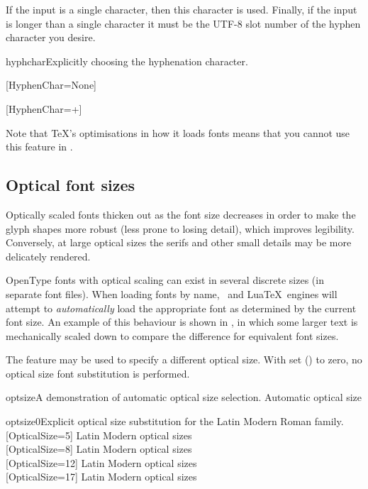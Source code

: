 \documentclass[a4paper]{l3doc}
\begin{document}
If the input is a single character, then this character is used.
Finally, if the input is longer than a single character
it must be the UTF-8 slot number of the hyphen character you desire.

\begin{Xexample}{hyphchar}{Explicitly choosing the hyphenation character.}
 \def\text{\fbox{\parbox{1.55cm}{%
   EXAMPLE HYPHENATION%
 }}\qquad\qquad\null\par\bigskip}

 [HyphenChar=None]
 \text
 [HyphenChar={+}]
 \text
\end{Xexample}

Note that \TeX's optimisations in how it loads fonts means that you cannot
use this feature in .

\subsection{Optical font sizes} \label{sec:opticalsize}

Optically scaled fonts thicken out as the font size decreases
in order to make the glyph shapes more robust (less prone to losing
detail), which improves legibility. Conversely, at large optical
sizes the serifs and other small details may be more delicately
rendered.

OpenType fonts with optical scaling can exist in
several discrete sizes (in separate font files).
When loading fonts by name, \XeTeX\ and Lua\TeX\ engines will attempt to
\emph{automatically} load the appropriate font as determined by the current font size.
An example of this behaviour is shown in , in which some larger text is
mechanically scaled down to compare the difference for equivalent font sizes.

The  feature may be used to specify a different optical size.
With  set ()
to zero, no optical size font substitution is performed.

\begin{Lexample}{optsize}{A demonstration of automatic optical size selection.}
   Automatic optical size                  \\
  \scalebox{0.4}{\Huge
   Automatic optical size}
\end{Lexample}

\begin{Lexample}{optsize0}{Explicit optical size substitution for the Latin Modern Roman family.}
  [OpticalSize=5]
   Latin Modern optical sizes                \\
  [OpticalSize=8]
   Latin Modern optical sizes                \\
  [OpticalSize=12]
   Latin Modern optical sizes                \\
  [OpticalSize=17]
   Latin Modern optical sizes
\end{Lexample}
\end{document}
